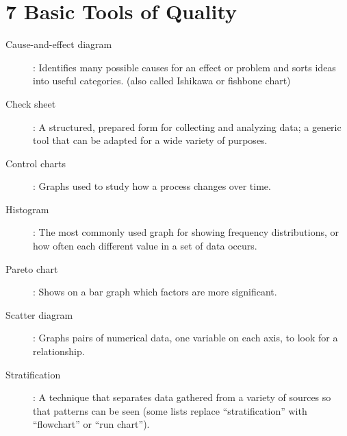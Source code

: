 \documentclass[11pt]{article} %
\begin{document}
\tableofcontents
\newpage
\section{7 Basic Tools of Quality }
\begin{description}
\item[Cause-and-effect diagram]: Identifies many possible causes for an effect or problem and sorts ideas into useful categories.
(also called Ishikawa or fishbone chart)

\item[Check sheet]: A structured, prepared form for collecting and analyzing data; a generic tool that can be adapted for a wide variety of purposes.

\item[Control charts]: Graphs used to study how a process changes over time.

\item[Histogram]: The most commonly used graph for showing frequency distributions, or how often each different value in a set of data occurs.

\item[Pareto chart]: Shows on a bar graph which factors are more significant.

\item[Scatter diagram]: Graphs pairs of numerical data, one variable on each axis, to look for a relationship.
\item[Stratification]: A technique that separates data gathered from a variety of sources so that patterns can be seen (some lists replace “stratification” with “flowchart” or “run chart”).
\end{description}
\end{document}
